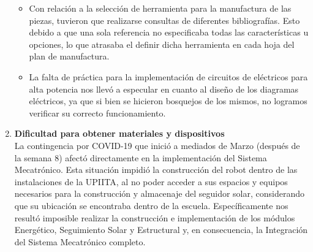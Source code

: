 \begin{enumerate}
\begin{itemize}
        \item Con relación a la selección de herramienta para la manufactura de las piezas, tuvieron que realizarse consultas de diferentes bibliografías. Esto debido a que una sola referencia no especificaba todas las características u opciones, lo que atrasaba el definir dicha herramienta en cada hoja del plan de manufactura.
        \item La falta de práctica para la implementación de circuitos de eléctricos para alta potencia nos llevó a especular en cuanto al diseño de los diagramas eléctricos, ya que si bien se hicieron bosquejos de los mismos, no logramos verificar su correcto funcionamiento.
    \end{itemize}
    \item \textbf{Dificultad para obtener materiales y dispositivos}\\
    La contingencia por COVID-19 que inició a mediados de Marzo (después de la semana 8) afectó directamente en la implementación del Sistema Mecatrónico. Esta situación impidió la construcción del robot dentro de las instalaciones de la UPIITA, al no poder acceder a sus espacios y equipos necesarios para la construcción y almacenaje del seguidor solar, considerando que su ubicación se encontraba dentro de la escuela. Específicamente nos resultó imposible realizar la construcción e implementación de los módulos Energético, Seguimiento Solar y Estructural y, en consecuencia, la Integración del Sistema Mecatrónico completo.
\end{enumerate}
\endinput